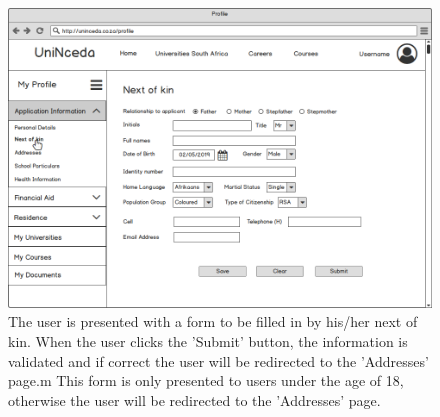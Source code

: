 \documentclass[a4paper, 12pt]{article}
\begin{document}
\begin{figure}[H]
\centering
\includegraphics[scale=0.4]{ProfileAppInfoNextOfKin}
\caption{The user is presented with a form to be filled in by his/her next of kin. When the user clicks the 'Submit' button, the information is validated and if correct the user will be redirected to the 'Addresses' page.m This form is only presented to users under the age of 18, otherwise the user will be redirected to the 'Addresses' page.}
\label{ProfileAppInfoNextOfKin)}
\end{figure}
\end{document}
